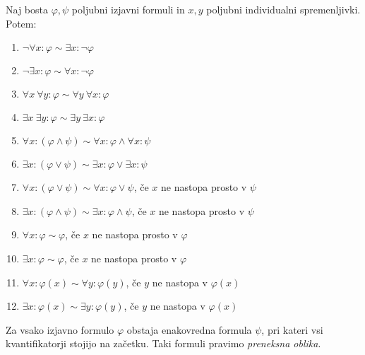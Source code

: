 \documentclass[12pt, a4paper]{article}
\begin{document}
\begin{izrek}
Naj bosta $\varphi,\psi$ poljubni izjavni formuli in $x,y$ poljubni individualni spremenljivki. Potem:

\begin{enumerate}
\item $\neg\forall x\colon \varphi\sim\exists x\colon\neg\varphi$
\item $\neg\exists x\colon\varphi\sim\forall x\colon\neg\varphi$
\item $\forall x~\forall y\colon\varphi\sim\forall y~\forall x\colon\varphi$
\item $\exists x~\exists y\colon\varphi\sim\exists y~\exists x\colon\varphi$
\item $\forall x\colon(\varphi\land\psi)\sim\forall x\colon\varphi\land\forall x\colon\psi$
\item $\exists x\colon(\varphi\lor\psi)\sim\exists x\colon\varphi\lor\exists x\colon\psi$
\item $\forall x\colon(\varphi\lor\psi)\sim\forall x\colon\varphi\lor\psi$, če $x$ ne nastopa prosto v $\psi$
\item $\exists x\colon(\varphi\land\psi)\sim\exists x\colon\varphi\land\psi$, če $x$ ne nastopa prosto v $\psi$
\item $\forall x\colon\varphi\sim\varphi$, če $x$ ne nastopa prosto v  $\varphi$
\item $\exists x\colon\varphi\sim\varphi$, če $x$ ne nastopa prosto v  $\varphi$
\item $\forall x\colon\varphi(x)\sim\forall y\colon\varphi(y)$, če $y$ ne nastopa v $\varphi(x)$
\item $\exists x\colon\varphi(x)\sim\exists y\colon\varphi(y)$, če $y$ ne nastopa v $\varphi(x)$
\end{enumerate}
\end{izrek}

\begin{definicija}
Za vsako izjavno formulo $\varphi$ obstaja enakovredna formula $\psi$, pri kateri vsi kvantifikatorji stojijo na začetku. Taki formuli pravimo \emph{preneksna oblika}.
\end{definicija}
\end{document}
